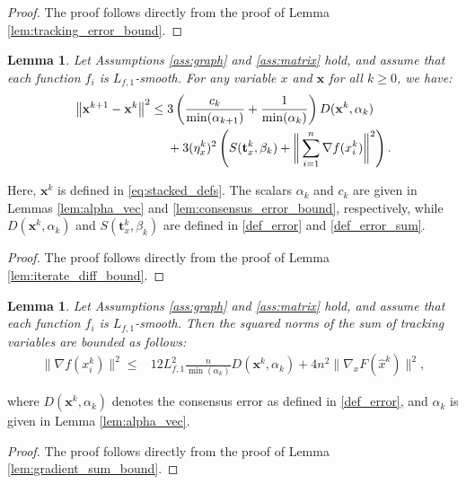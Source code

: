 \documentclass{article}
\theoremstyle{plain}
\newtheorem{lemma}[theorem]{Lemma}
\theoremstyle{definition}
\theoremstyle{remark}
\begin{document}
\begin{proof}
    The proof follows directly from the proof of  Lemma \ref{lem:tracking_error_bound}.
\end{proof}
\begin{lemma}\label{lem:iterate_diff_bound_single}
     Let Assumptions \ref{ass:graph} and \ref{ass:matrix} hold, and assume that each function $f_{i}$ is $L_{f,1}$-smooth. For any variable $x$ and $\mathbf{x}$ for all $k \geq 0$, we have:
    \begin{align}
        \left\|\mathbf{x}^{k+1}-\mathbf{x}^k\right\|^{2} \leq{}& 3 \left( \frac{c_k}{\min(\alpha_{k+1})} + \frac{1}{\min(\alpha_k)} \right) D(\mathbf{x}^k, \alpha_k) \notag \\
        &+ 3(\eta_{x}^{k})^{2} \left( S(\mathbf{t}_{x}^{k},\beta_{k}) + \bigg\| \sum_{i=1}^n \nabla f(x_i^k) \bigg\|^{2} \right).
    \end{align}
\end{lemma}
 Here, $\mathbf{x}^k$ is defined in \eqref{eq:stacked_defs}. The scalars  $\alpha_k$ and $c_{k}$ are given in Lemmas \ref{lem:alpha_vec} and \ref{lem:consensus_error_bound}, respectively, while $D(\mathbf{x}^k, \alpha_k)$  and $S(\mathbf{t}_{x}^{k},\beta_{k})$ are defined in  \eqref{def_error} and \eqref{def_error_sum}.
 \begin{proof}
    The proof follows directly from the proof of  Lemma \ref{lem:iterate_diff_bound}.
\end{proof}
\begin{lemma}\label{lem:gradient_sum_bound_single}
    Let Assumptions \ref{ass:graph} and \ref{ass:matrix} hold, and assume that each function $f_{i}$ is $L_{f,1}$-smooth. Then the squared norms of the sum of tracking variables are bounded as follows:
    \begin{align}
        \bigg\| \nabla f(x_i^k)\bigg\|^{2} \leq{}& 12 L_{f,1}^{2}\frac{n}{\min(\alpha_{k})}D(\mathbf{x}^{k}, \alpha_{k}) + 4n^{2}\big\| \nabla_{x} F({\hat{x}}^k) \big\|^{2}, \label{eq:dx_bound_single} 
    \end{align}
\end{lemma}
where $D(\mathbf{x}^{k}, \alpha_{k})$ denotes the consensus error as defined in \eqref{def_error}, and $\alpha_{k}$ is given in Lemma \ref{lem:alpha_vec}.
 \begin{proof}
    The proof follows directly from the proof of Lemma \ref{lem:gradient_sum_bound}.
\end{proof}
\end{document}

